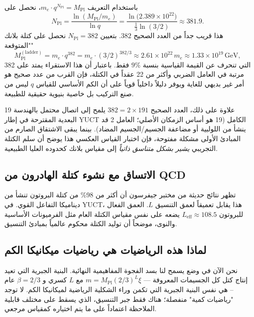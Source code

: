 \documentclass[11pt,a4paper]{article}
\newcommand{\Mpl}{M_{\mathrm{Pl}}}
\begin{document}
	باستخدام التعريف $m_e \cdot q^{N_{\mathrm{Pl}}} = \Mpl$، نحصل على
	\begin{equation}
		N_{\mathrm{Pl}} = \frac{\ln(\Mpl/m_e)}{\ln q}
		= \frac{\ln\!\big(2.389\times10^{22}\big)}{\frac13\ln(3/2)}
		\approx 381.9.
		\label{eq:Npl}
	\end{equation}
	هذا قريب جداً من العدد الصحيح $382$. بتعيين $N_{\mathrm{Pl}} = 382$ نحصل على كتلة بلانك "المتوقعة"
	\begin{equation}
		\Mpl^{\mathrm{(ladder)}} = m_e \cdot q^{382}
		= m_e \cdot (3/2)^{382/3}
		\approx 2.61\times10^{22}\,m_e
		\approx 1.33\times10^{19}\,\text{GeV},
		\label{eq:Mpl_ladder}
	\end{equation}
	التي تنحرف عن القيمة القياسية بنسبة $9\%$ فقط. باعتبار أن هذا الاستقراء يمتد على 382 مرتبة في العامل الضربي وأكثر من 22 عقداً في الكتلة، فإن القرب من عدد صحيح هو أمر غير بديهي للغاية ويوفر دليلاً داخلياً قوياً على أن الكم الأساسي للقياس $q$ ليس من صنع التركيب بل خاصية بنيوية حقيقية للطبيعة.
	
	علاوة على ذلك، العدد الصحيح $382 = 2 \times 191$ يلمح إلى اتصال محتمل بالهندسة 19 البعدية المقترحة في إطار YUCT الكامل (19 هو أساس الزمكان الأصلي؛ العامل 2 قد ينشأ من اللولبية أو مضاعفة الجسيم/الجسيم المضاد). بينما يبقى الاشتقاق الصارم من المبادئ الأولى مشكلة مفتوحة، فإن اختبار القياس العكسي هذا يوضح أن سلم الكتلة التجريبي \emph{يشير بشكل متناسق ذاتياً} إلى مقياس بلانك كحدوده العليا الطبيعية.
	
	\subsection{الاتساق مع نشوء كتلة الهادرون من QCD}
	
	تظهر نتائج حديثة من مختبر جيفرسون أن أكثر من 98\% من كتلة البروتون تنشأ من ديناميكا التفاعل القوي. في YUCT، هذا يقابل تعميقاً لعمق التنسيق \(L\). العمق الفعال للبروتون \(L_{\mathrm{eff}} \approx 108.5\) يضعه على نفس مقياس الكتلة العام مثل الفرميونات الأساسية والنوى، موضحاً أن توليد الكتلة محكوم عالمياً بمبادئ التنسيق.
	
	\subsection{لماذا هذه الرياضيات هي رياضيات ميكانيكا الكم}
	\label{subsec:QM-as-YUCT}
	
	نحن الآن في وضع يسمح لنا بسد الفجوة المفاهيمية النهائية. البنية الجبرية التي تعيد إنتاج كتل كل الجسيمات المعروفة --- \(m = M_{\mathrm{Pl}}(2/3)^L\xi\) مع \(L\) كسري و \(\beta=2/3\) عام -- هي نفس البنية الجبرية التي تكمن وراء الشكلية الرياضية لميكانيكا الكم. لا توجد "رياضيات كمية" منفصلة؛ هناك فقط جبر التنسيق، الذي يسقط على مختلف قابلية الملاحظة اعتماداً على ما يتم اختياره كمقياس مرجعي.
	
\end{document}
